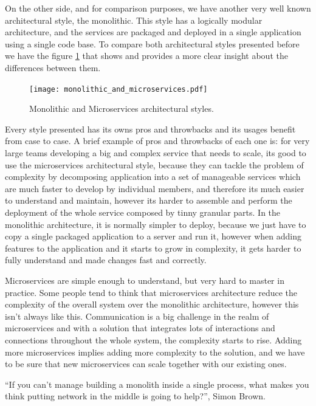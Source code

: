 On the other side, and for comparison purposes, we have another very well known architectural style, the monolithic. This style has a logically modular architecture, and the services are packaged and deployed in a single  application using a single code base. To compare both architectural styles presented before we have the figure \ref{fig:monolithic_and_microservices} that shows and provides a more clear insight about the differences between them.

\begin{figure}[H]
    \centering
    \texttt{[image: monolithic\_and\_microservices.pdf]}
    \caption{Monolithic and Microservices architectural styles\cite{microservices}.}
    \label{fig:monolithic_and_microservices}
\end{figure}

Every style presented has its owns pros and throwbacks and its usages benefit from case to case. A brief example of pros and throwbacks of each one is: for very large teams developing a big and complex service that needs to scale, its good to use the microservices architectural style, because they can tackle the problem of complexity by decomposing application into a set of manageable services which are much faster to develop by individual members, and therefore its much easier to understand and maintain, however its harder to assemble and perform the deployment of the whole service composed by tinny granular parts. In the monolithic architecture, it is normally simpler to deploy, because we  just have to copy a single packaged application to a server and run it, however when adding features to the application and it starts to grow in complexity, it gets harder to fully understand and made changes fast and correctly.

Microservices are simple enough to understand, but very hard to master in practice. Some people tend to think that microservices architecture reduce the complexity of the overall system over the monolithic architecture, however this isn't always like this. Communication is a big challenge in the realm of microservices and with a solution that integrates lots of interactions and connections throughout the whole system, the complexity starts to rise. Adding more microservices implies adding more complexity to the solution, and we have to be sure that new microservices can scale together with our existing ones.

``If you can’t manage building a monolith inside a single process, what makes you think putting network in the middle is going to help?'', Simon Brown\cite{simon_brown_microservices}.

